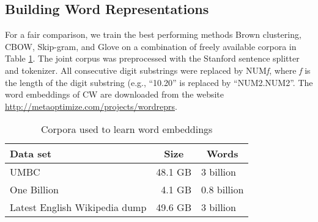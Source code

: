\subsection{Building Word Representations}
\label{buildingWordRep}
For a fair comparison, we train the best performing methods Brown clustering, CBOW, Skip-gram, and Glove on a combination of freely available corpora in Table \ref{wordEmbedCorpora}. The joint corpus was preprocessed with the Stanford sentence splitter and tokenizer. All consecutive digit substrings were replaced by NUM\textit{f}, where \textit{f} is the length of the digit substring (e.g., ``10.20'' is replaced by ``NUM2.NUM2''. The word embeddings of CW are downloaded from the website \url{http://metaoptimize.com/projects/wordreprs}.

\begin{table}[h]\centering\small
\begin{tabular}{lrl}
\hline
\textbf{Data set} & \multicolumn{1}{c}{\textbf{Size}} & \multicolumn{1}{c}{\textbf{Words}} \\ \hline
UMBC 	& 48.1 GB & 3 billion \\
One Billion 	& 4.1 GB & 0.8 billion  \\
Latest English Wikipedia dump & 49.6 GB & 3 billion \\ \hline
\end{tabular}
\caption{Corpora used to learn word embeddings}
\label{wordEmbedCorpora}
\end{table}

